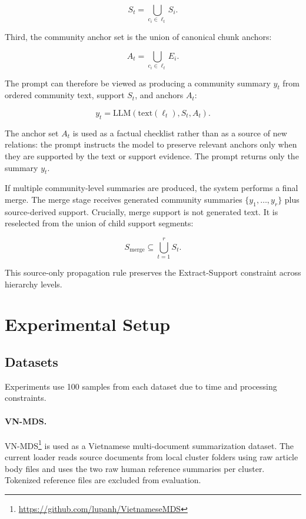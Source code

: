 \documentclass[11pt]{article}
\begin{document}
\begin{equation}
S_t = \bigcup_{c_i \in \ell_t} S_i.
\end{equation}

Third, the community anchor set is the union of canonical chunk anchors:

\begin{equation}
A_t = \bigcup_{c_i \in \ell_t} E_i.
\end{equation}

The prompt can therefore be viewed as producing a community summary $y_t$ from ordered community text, support $S_t$, and anchors $A_t$:

\begin{equation}
y_t = \mathrm{LLM}(\mathrm{text}(\ell_t), S_t, A_t).
\end{equation}

The anchor set $A_t$ is used as a factual checklist rather than as a source of new relations: the prompt instructs the model to preserve relevant anchors only when they are supported by the text or support evidence. The prompt returns only the summary $y_t$.

If multiple community-level summaries are produced, the system performs a final merge. The merge stage receives generated community summaries $\{y_1,\ldots,y_r\}$ plus source-derived support. Crucially, merge support is not generated text. It is reselected from the union of child support segments:

\begin{equation}
S_{\mathrm{merge}} \subseteq \bigcup_{t=1}^{r} S_t.
\end{equation}

This source-only propagation rule preserves the Extract-Support constraint across hierarchy levels.

\section{Experimental Setup}
\label{sec:experiments}

\subsection{Datasets}

Experiments use 100 samples from each dataset due to time and processing constraints.

\paragraph{VN-MDS.}
VN-MDS\footnote{\url{https://github.com/lupanh/VietnameseMDS}} is used as a Vietnamese multi-document summarization dataset. The current loader reads source documents from local cluster folders using raw article body files and uses the two raw human reference summaries per cluster. Tokenized reference files are excluded from evaluation.
\end{document}
